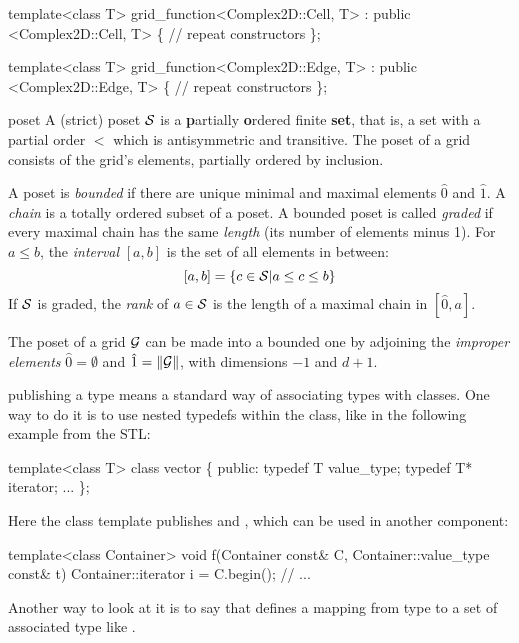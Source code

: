 \begin{Glossar}
\begin{example}
  template<class T>
  grid_function<Complex2D::Cell, T> 
    : public <Complex2D::Cell, T> \{
    // repeat constructors
  \};

  template<class T>
  grid_function<Complex2D::Edge, T> 
    : public <Complex2D::Edge, T> \{
    // repeat constructors
  \};
  \end{example}

\item[poset]
A (strict) poset ${\cal S}$ is a {\bf p}artially {\bf o}rdered finite {\bf set}, 
that is, a set with a partial order $<$ 
which is antisymmetric and transitive. 
The poset of a grid consists of the grid's elements,
partially ordered by inclusion.

A poset is {\sl bounded\/} if there are unique minimal and maximal elements
$\hat{0}$ and $\hat{1}$.
A {\sl chain\/} is a totally ordered subset of a poset. A bounded poset
is called {\sl graded\/} if every maximal chain has the same {\sl length}
(its number of elements minus 1). 
For $ a \leq b$, the {\sl interval\/} $[a,b]$ 
is the set of all elements in between:
\[
  [a,b] = \{ c \in {\cal S} | a \leq c \leq b \}
\]
If ${\cal S}$ is graded, the {\sl rank\/} of $a \in {\cal S}$ is the length
of a maximal chain in $[\hat{0},a]$.

The poset of a grid ${\cal G}$ can be made into a bounded one by adjoining
the {\sl improper elements\/}  $\hat{0} = \emptyset$
and $\hat{1} = \|{\cal G}\|$, with dimensions $-1$ and $d+1$.

  
\item[publishing a type] means a standard way of associating types with classes.
  One way to do it is to use nested typedefs within the class, like in the following
  example from the STL:
  \begin{example}
   template<class T>
   class vector \{
   public:
     typedef T  value_type;
     typedef T* iterator;
     ...
   \};
  \end{example}
  Here the class template  publishes  and ,
  which can be used in another component:
  \begin{example}
    template<class Container>
    void f(Container const& C, Container::value_type const& t) {
      Container::iterator i = C.begin();
      // ...
    }
  \end{example}
  Another way to look at it is to say that  defines
  a mapping from type  to a set of associated type like
  .


\end{Glossar}
